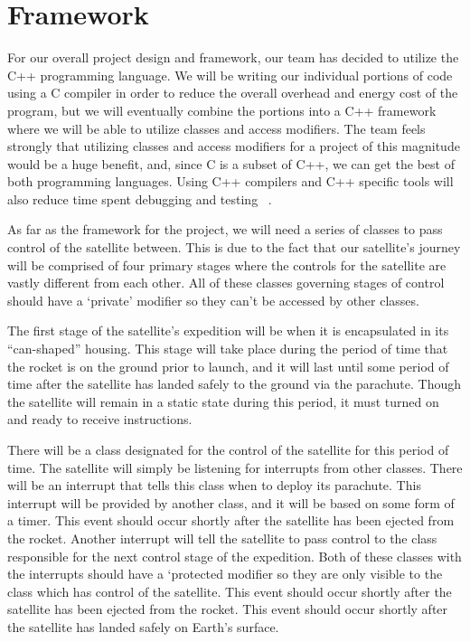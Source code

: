 \documentclass[10pt,letterpaper,onecolumn,journal]{IEEEtran}
\begin{document}
%
%
\section{Framework}
For our overall project design and framework, our team has decided to utilize the C++ programming language. We will be writing our individual portions of code using a C compiler in order to reduce the overall overhead and energy cost of the program, but we will eventually combine the portions into a C++ framework where we will be able to utilize classes and access modifiers. The team feels strongly that utilizing classes and access modifiers for a project of this magnitude would be a huge benefit, and, since C is a subset of C++, we can get the best of both programming languages. Using C++ compilers and C++ specific tools will also reduce time spent debugging and testing ~\cite{codeproject}.\vspace{.3cm}
\par 
As far as the framework for the project, we will need a series of classes to pass control of the satellite between. This is due to the fact that our satellite's journey will be comprised of four primary stages where the controls for the satellite are vastly different from each other. All of these classes governing stages of control should have a ‘private’ modifier so they can't be accessed by other classes.\vspace{.3cm}
\par 
The first stage of the satellite's expedition will be when it is encapsulated in its “can-shaped” housing. This stage will take place during the period of time that the rocket is on the ground prior to launch, and it will last until some period of time after the satellite has landed safely to the ground via the parachute. Though the satellite will remain in a static state during this period, it must turned on and ready to receive instructions.\vspace{.3cm}
\par 
There will be a class designated for the control of the satellite for this period of time. The satellite will simply be listening for interrupts from other classes.  There will be an interrupt that tells this class when to deploy its parachute. This interrupt will be provided by another class, and it will be based on some form of a timer. This event should occur shortly after the satellite has been ejected from the rocket. Another interrupt will tell the satellite to pass control to the class responsible for the next control stage of the expedition. Both of these classes with the interrupts should have a ‘protected modifier so they are only visible to the class which has control of the satellite. This event should occur shortly after the satellite has been ejected from the rocket. This event should occur shortly after the satellite has landed safely on Earth's surface.\vspace{.3cm}
\end{document}
